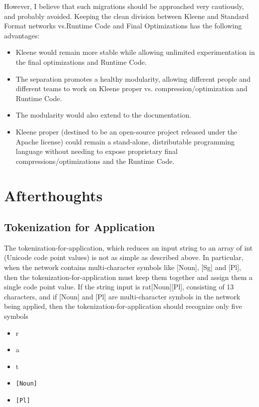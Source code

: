 \documentclass[letterpaper,12pt]{article}
\begin{document}
However, I believe that such migrations should be approached very cautiously, and probably avoided.
Keeping the clean division between Kleene and Standard Format networks vs.\@ Runtime Code and Final
Optimizations has the following advantages: 

\begin{itemize}

\item
Kleene would remain more stable while allowing unlimited experimentation in the final
optimizations and Runtime Code.
\item
The separation promotes a healthy modularity, 
allowing different people and different teams to work on Kleene proper vs.\@
compression/optimization and Runtime Code.
\item
The modularity would also extend to the documentation.
\item
Kleene proper (destined to be an open-source project released under the Apache license) could remain a
stand-alone, distributable programming language without needing to expose proprietary final
compressions/optimizations and the Runtime Code.
\end{itemize}

\section{Afterthoughts}

\subsection{Tokenization for Application}

The tokenization-for-application, which reduces an input string to an array of int (Unicode code point
values) is not as simple as described above.  In particular, when the network contains multi-character
symbols like [Noun], [Sg] and [Pl], then the tokenization-for-application must keep them together and
assign them a single code point value.  If the string input is rat[Noun][Pl], consisting of 13 characters, and if [Noun]
and [Pl] are multi-character symbols in the network being applied, then the tokenization-for-application should recognize
only five symbols

\begin{itemize}
\item
r
\item
a
\item
t
\item
\verb![Noun]!
\item
\verb![Pl]!
\end{itemize}
\end{document}
